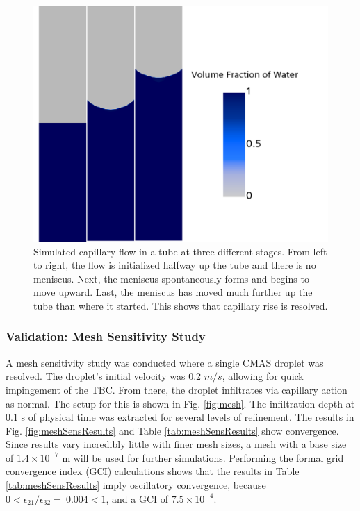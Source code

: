 \documentclass{UCF_ETD}
\begin{document}
\begin{figure}
    \centering
    \includegraphics[width=\linewidth]{Figures/validation_capillaryRise.png}
    \caption{Simulated capillary flow in a tube at three different stages. From left to right, the flow is initialized halfway up the tube and there is no meniscus. Next, the meniscus spontaneously forms and begins to move upward. Last, the meniscus has moved much further up the tube than where it started. This shows that capillary rise is resolved.}
    \label{fig:capillaryRise}
\end{figure}

\subsubsection{Validation: Mesh Sensitivity Study}
A mesh sensitivity study was conducted where a single CMAS droplet was resolved. The droplet's initial velocity was 0.2 $m/s$, allowing for quick impingement of the TBC. From there, the droplet infiltrates via capillary action as normal. The setup for this is shown in Fig. \ref{fig:mesh}. The infiltration depth at 0.1 s of physical time was extracted for several levels of refinement. The results in Fig. \ref{fig:meshSensResults} and Table \ref{tab:meshSensResults} show convergence. Since results vary incredibly little with finer mesh sizes, a mesh with a base size of ${1.4\times 10^{-7}}$ m will be used for further simulations. Performing the formal grid convergence index (GCI) calculations \cite{ECA2014104, celik2008procedure} shows that the results in Table \ref{tab:meshSensResults} imply oscillatory convergence, because  $0<\epsilon_{21}/\epsilon_{32}=\ 0.004<1$, and a GCI of $7.5\times 10^{-4}$.
\end{document}
